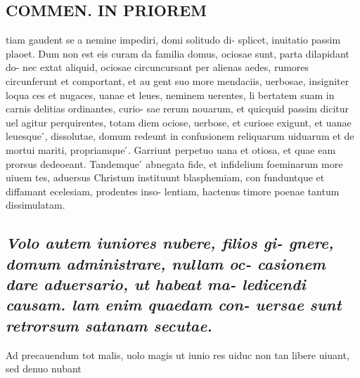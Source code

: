 \documentclass{article}
\begin{document}
\begin{pages}
\section*{COMMEN. IN PRIOREM }
\marginpar{[ p.132 ]}\pstart tiam gaudent se a nemine impediri, domi solitudo di- splicet, inuitatio passim plaoet. Dum non est eis curam da familia domus, ociosae sunt, parta dilapidant do- nec extat aliquid, ociosae circuncursant per alienas aedes, rumores circunferunt et comportant, et au gent suo more mendaciis, uerbosae, insigniter loqua ces et nugaces, uanae et leues, neminem uerentes, li bertatem suam in carnis delitias ordinantes, curio- sae rerum nouarum, et quicquid passim dicitur uel agitur perquirentes, totam diem ociose, uerbose, et curiose exigunt, et uanae leuesque ́, dissolutae, domum redeunt in confusionem reliquarum uiduarum et de mortui mariti, propriamque ́. Garriunt perpetuo uana et otiosa, et quae eam prorsus dedeoeant. Tandemque ́ abnegata fide, et infidelium foeminarum more uiuem tes, aduersus Christum instituunt blasphemiam, con funduntque et diffamant ecelesiam, prodentes inso- lentiam, hactenus timore poenae tantum dissimulatam.  \pend
{}
{}
\subsection*{\textit{Volo autem iuniores nubere, filios gi- gnere, domum administrare, nullam oc- casionem dare aduersario, ut habeat ma- ledicendi causam. lam enim quaedam con- uersae sunt retrorsum satanam secutae. }}\pstart Ad precauendum tot malis, uolo magis ut iunio res uiduc non tan libere uiuant, sed denuo nubant  \pend

\end{pages}
\end{document}
